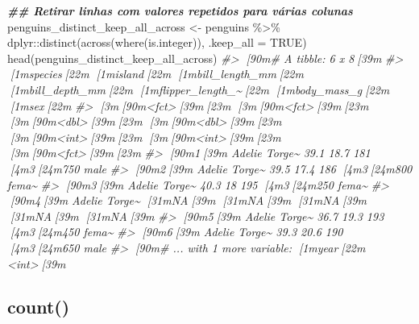 \documentclass[
]{book}
\newenvironment{Shaded}{\begin{snugshade}}{\end{snugshade}}
\newcommand{\AttributeTok}[1]{\textcolor[rgb]{0.61,0.61,0.61}{#1}}
\newcommand{\CommentTok}[1]{\textcolor[rgb]{0.37,0.37,0.37}{\textit{#1}}}
\newcommand{\ConstantTok}[1]{\textcolor[rgb]{0,0,0}{#1}}
\newcommand{\DocumentationTok}[1]{\textcolor[rgb]{0.37,0.37,0.37}{\textbf{\textit{#1}}}}
\newcommand{\FunctionTok}[1]{\textcolor[rgb]{0,0,0}{#1}}
\newcommand{\NormalTok}[1]{#1}
\newcommand{\OtherTok}[1]{\textcolor[rgb]{0.37,0.37,0.37}{#1}}
\newcommand{\SpecialCharTok}[1]{\textcolor[rgb]{0,0,0}{#1}}
\begin{document}
\begin{Shaded}
\begin{Highlighting}[]
\DocumentationTok{\#\# Retirar linhas com valores repetidos para várias colunas}
\NormalTok{penguins\_distinct\_keep\_all\_across }\OtherTok{\textless{}{-}}\NormalTok{ penguins }\SpecialCharTok{\%\textgreater{}\%} 
\NormalTok{  dplyr}\SpecialCharTok{::}\FunctionTok{distinct}\NormalTok{(}\FunctionTok{across}\NormalTok{(}\FunctionTok{where}\NormalTok{(is.integer)), }\AttributeTok{.keep\_all =} \ConstantTok{TRUE}\NormalTok{)}
\FunctionTok{head}\NormalTok{(penguins\_distinct\_keep\_all\_across)}
\CommentTok{\#\textgreater{} [90m\# A tibble: 6 x 8[39m}
\CommentTok{\#\textgreater{}   [1mspecies[22m [1misland[22m [1mbill\_length\_mm[22m [1mbill\_depth\_mm[22m [1mflipper\_length\_\textasciitilde{}[22m [1mbody\_mass\_g[22m [1msex[22m  }
\CommentTok{\#\textgreater{}   [3m[90m\textless{}fct\textgreater{}[39m[23m   [3m[90m\textless{}fct\textgreater{}[39m[23m           [3m[90m\textless{}dbl\textgreater{}[39m[23m         [3m[90m\textless{}dbl\textgreater{}[39m[23m            [3m[90m\textless{}int\textgreater{}[39m[23m       [3m[90m\textless{}int\textgreater{}[39m[23m [3m[90m\textless{}fct\textgreater{}[39m[23m}
\CommentTok{\#\textgreater{} [90m1[39m Adelie  Torge\textasciitilde{}           39.1          18.7              181        [4m3[24m750 male }
\CommentTok{\#\textgreater{} [90m2[39m Adelie  Torge\textasciitilde{}           39.5          17.4              186        [4m3[24m800 fema\textasciitilde{}}
\CommentTok{\#\textgreater{} [90m3[39m Adelie  Torge\textasciitilde{}           40.3          18                195        [4m3[24m250 fema\textasciitilde{}}
\CommentTok{\#\textgreater{} [90m4[39m Adelie  Torge\textasciitilde{}           [31mNA[39m            [31mNA[39m                 [31mNA[39m          [31mNA[39m [31mNA[39m   }
\CommentTok{\#\textgreater{} [90m5[39m Adelie  Torge\textasciitilde{}           36.7          19.3              193        [4m3[24m450 fema\textasciitilde{}}
\CommentTok{\#\textgreater{} [90m6[39m Adelie  Torge\textasciitilde{}           39.3          20.6              190        [4m3[24m650 male }
\CommentTok{\#\textgreater{} [90m\# ... with 1 more variable: [1myear[22m \textless{}int\textgreater{}[39m}
\end{Highlighting}
\end{Shaded}

\hypertarget{count}{%
\subsection{count()}\label{count}}
\end{document}
